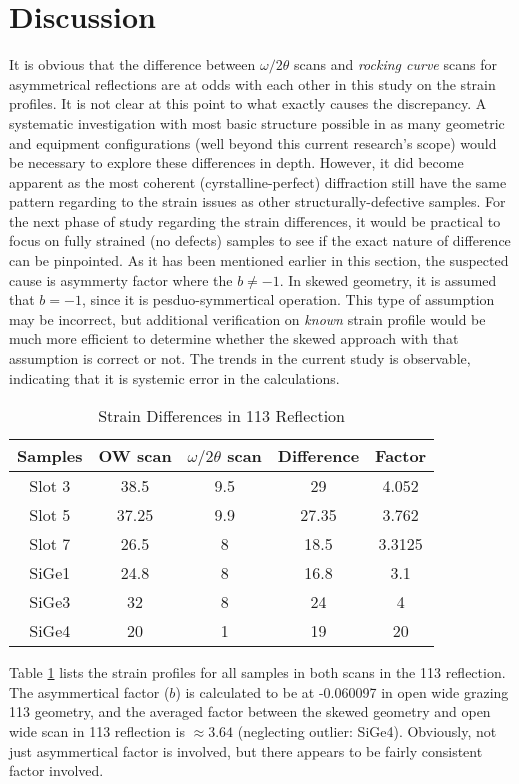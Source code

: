 \section{Discussion}

It is obvious that the difference between $\omega/2\theta$ scans and \emph{rocking curve} scans for asymmetrical reflections are at odds with each other in this study on the strain profiles.  It is not clear at this point to what exactly causes the discrepancy.  A systematic investigation with most basic structure possible in as many geometric and equipment configurations (well beyond this current research's scope) would be necessary to explore these differences in depth.  However, it did become apparent as the most coherent (cyrstalline-perfect) diffraction still have the same pattern regarding to the strain issues as other structurally-defective samples.  For the next phase of study regarding the strain differences, it would be practical to focus on fully strained (no defects) samples to see if the exact nature of difference can be pinpointed.  As it has been mentioned earlier in this section, the suspected cause is asymmerty factor where the $b \neq -1$.  In skewed geometry, it is assumed that $b = -1$, since it is pesduo-symmertical operation.  This type of assumption may be incorrect, but additional verification on \emph{known} strain profile would be much more efficient to determine whether the skewed approach with that assumption is correct or not.  The trends in the current study is observable, indicating that it is systemic error in the calculations.

\begin{table}[h]
\centering
\caption{Strain Differences in 113 Reflection}
\label{diff-113}
\begin{tabular}{c|cccc}
Samples & OW scan & $\omega/2\theta$ scan & Difference & Factor\\
\hline
  Slot 3 & 38.5&9.5&29 & 4.052\\
 Slot 5 & 37.25 &9.9&27.35 & 3.762\\
Slot 7&26.5&8&18.5 & 3.3125\\
SiGe1&24.8&8& 16.8 & 3.1\\
SiGe3&32&8&24 & 4\\
SiGe4&20&1&19 & 20\\
\end{tabular}
\end{table}

Table \ref{diff-113} lists the strain profiles for all samples  in both scans in the 113 reflection.  The asymmertical factor ($b$) is calculated to be at -0.060097 in open wide grazing 113 geometry, and the averaged factor between the skewed geometry and open wide scan in 113 reflection is $\approx 3.64 $ (neglecting outlier: SiGe4).   Obviously, not just asymmertical factor is involved, but there appears to be fairly consistent factor involved.


